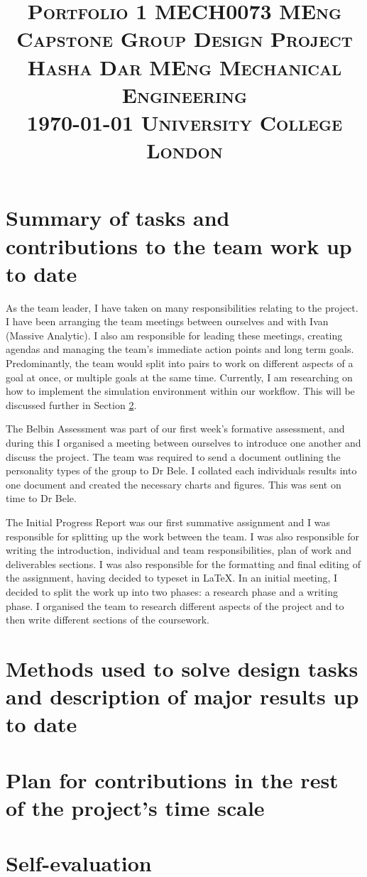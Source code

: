 \documentclass[10pt]{article}
\title{
    \textsc{\huge Portfolio 1 }\hfill \textsc{\large MECH0073 MEng Capstone Group Design Project}\\%
    \textsc{\large Hasha Dar} \hfill \textsc{\large MEng Mechanical Engineering }\\
    \textsc{\large \today} \hfill \textsc{\large University College London }
}
\date{}
\begin{document}
\maketitle
\section{Summary of tasks and contributions to the team work up to date}
As the team leader, I have taken on many responsibilities relating to the project. I have been arranging the team meetings between ourselves and with Ivan (Massive Analytic). I also am responsible for leading these meetings, creating agendas and managing the team's immediate action points and long term goals. Predominantly, the team would split into pairs to work on different aspects of a goal at once, or multiple goals at the same time. Currently, I am researching on how to implement the simulation environment within our workflow. This will be discussed further in Section \ref{methods}. 

The Belbin Assessment was part of our first week's formative assessment, and during this I organised a meeting between ourselves to introduce one another and discuss the project. The team was required to send a document outlining the personality types of the group to Dr Bele. I collated each individuals results into one document and created the necessary charts and figures. This was sent on time to Dr Bele. 

The Initial Progress Report was our first summative assignment and I was responsible for splitting up the work between the team. I was also responsible for writing the introduction, individual and team responsibilities, plan of work and deliverables sections. I was also responsible for the formatting and final editing of the assignment, having decided to typeset in \LaTeX. In an initial meeting, I decided to split the work up into two phases: a research phase and a writing phase. I organised the team to research different aspects of the project and to then write different sections of the coursework. 
\section{Methods used to solve design tasks and description of major results up to date}\label{methods}
\section{Plan for contributions in the rest of the project's time scale}
\section{Self-evaluation}
\end{document}
